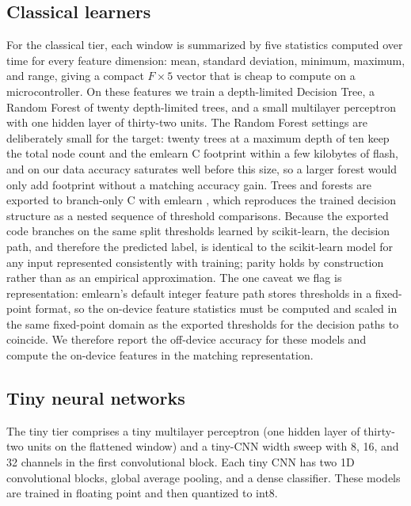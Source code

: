 \documentclass{ieeeaccess}
\begin{document}
\subsection{Classical learners}
For the classical tier, each window is summarized by five statistics computed over time for every feature dimension: mean, standard deviation, minimum, maximum, and range, giving a compact $F\times 5$ vector that is cheap to compute on a microcontroller. On these features we train a depth-limited Decision Tree, a Random Forest of twenty depth-limited trees, and a small multilayer perceptron with one hidden layer of thirty-two units. The Random Forest settings are deliberately small for the target: twenty trees at a maximum depth of ten keep the total node count and the emlearn C footprint within a few kilobytes of flash, and on our data accuracy saturates well before this size, so a larger forest would only add footprint without a matching accuracy gain. Trees and forests are exported to branch-only C with emlearn \cite{emlearn}, which reproduces the trained decision structure as a nested sequence of threshold comparisons. Because the exported code branches on the same split thresholds learned by scikit-learn, the decision path, and therefore the predicted label, is identical to the scikit-learn model for any input represented consistently with training; parity holds by construction rather than as an empirical approximation. The one caveat we flag is representation: emlearn's default integer feature path stores thresholds in a fixed-point format, so the on-device feature statistics must be computed and scaled in the same fixed-point domain as the exported thresholds for the decision paths to coincide. We therefore report the off-device accuracy for these models and compute the on-device features in the matching representation.

\subsection{Tiny neural networks}
The tiny tier comprises a tiny multilayer perceptron (one hidden layer of thirty-two units on the flattened window) and a tiny-CNN width sweep with 8, 16, and 32 channels in the first convolutional block. Each tiny CNN has two 1D convolutional blocks, global average pooling, and a dense classifier. These models are trained in floating point and then quantized to int8.
\end{document}
